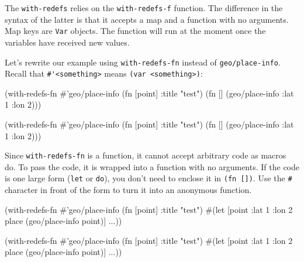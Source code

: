 
The \verb|with-redefs| relies on the \verb|with-redefs-f| function. The
difference in the syntax of the latter is that it accepts a map and a function
with no arguments.  Map keys are \verb|Var| objects. The function will run at
the moment once the variables have received new values.

Let's rewrite our example using \verb|with-redefs-fn| instead of \verb|geo/place-info|.
Recall that \verb|#'|\texttt{<some\-thing>} means \verb|(var <something>)|:

\ifx\DEVICETYPE\MOBILE

\begin{english}
  \begin{clojure}
(with-redefs-fn
  {#'geo/place-info (fn [point]
                      {:title "test"})}
  (fn []
    (geo/place-info {:lat 1 :lon 2})))
  \end{clojure}
\end{english}

\else

\begin{english}
  \begin{clojure}
(with-redefs-fn
  {#'geo/place-info (fn [point] {:title "test"})}
  (fn []
    (geo/place-info {:lat 1 :lon 2})))
  \end{clojure}
\end{english}

\fi


Since \verb|with-redefs-fn| is a function, it cannot accept arbitrary code as macros do.
To pass the code, it is wrapped into a function with no arguments.
If the code is one large form (\verb|let| or \verb|do|), you don't need to enclose it in \verb|(fn [])|.
Use the \verb|#| character in front of the form to turn it into an anonymous function.

\ifx\DEVICETYPE\MOBILE

\begin{english}
  \begin{clojure}
(with-redefs-fn
  {#'geo/place-info (fn [point]
                      {:title "test"})}
  #(let [point {:lat 1 :lon 2}
         place (geo/place-info point)]
     ...))
  \end{clojure}
\end{english}

\else

\begin{english}
  \begin{clojure}
(with-redefs-fn
  {#'geo/place-info (fn [point] {:title "test"})}
  #(let [point {:lat 1 :lon 2}
         place (geo/place-info point)]
     ...))
  \end{clojure}
\end{english}

